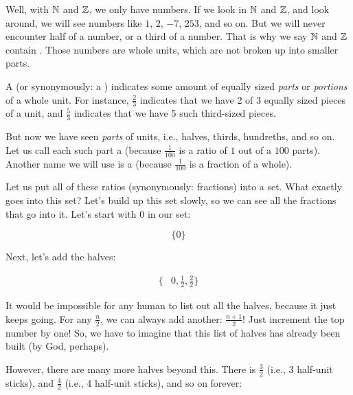 \documentclass[../../../main.tex]{subfiles}
\begin{document}
Well, with $\Nats/$ and $\Ints/$, we only have  numbers. If we look in $\Nats/$ and $\Ints/$, and look around, we will see numbers like $1$, $2$, $-7$, $253$, and so on. But we will never encounter half of a number, or a third of a number. That is why we say $\Nats/$ and $\Ints/$ contain . Those numbers are whole units, which are not broken up into smaller parts.

\begin{terminology}
  A  (or synonymously: a ) indicates some amount of equally sized \emph{parts} or \emph{portions} of a whole unit. For instance, $\frac{2}{3}$ indicates that we have 2 of 3 equally sized pieces of a unit, and $\frac{5}{3}$ indicates that we have 5 such third-sized pieces.
\end{terminology}

But now we have seen \emph{parts} of units, i.e., halves, thirds, hundreths, and so on. Let us call each such part a  (because $\frac{1}{100}$ is a ratio of $1$ out of a $100$ parts). Another name we will use is a  (because $\frac{1}{100}$ is a fraction of a whole).

Let us put all of these ratios (synonymously: fractions) into a set. What exactly goes into this set? Let's build up this set slowly, so we can see all the fractions that go into it. Let's start with 0 in our set:

\begin{equation*}
  \{ 0 \}
\end{equation*}

Next, let's add the halves:

\begin{align*}
  \{ &0, \frac{1}{2}, \frac{2}{2} \}
\end{align*}

\begin{aside}
  \begin{remark}
    It would be impossible for any human to list out all the halves, because it just keeps going. For any $\frac{n}{2}$, we can always add another: $\frac{n + 1}{2}$! Just increment the top number by one! So, we have to imagine that this list of halves has already been built (by God, perhaps).
  \end{remark}
\end{aside}

However, there are many more halves beyond this. There is $\frac{3}{2}$ (i.e., 3 half-unit sticks), and $\frac{4}{2}$ (i.e., 4 half-unit sticks), and so on forever:
\end{document}
